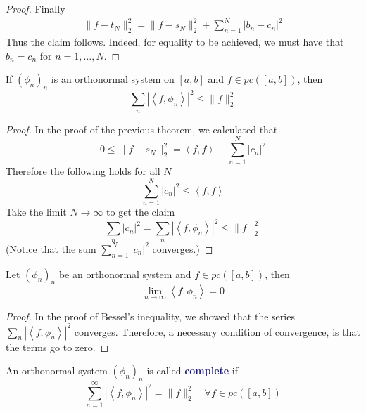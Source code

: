 \documentclass[11pt]{article}
\numberwithin{equation}{section}
\newcommand{\navy}[1]{\textcolor{MidnightBlue}{\bf #1}}
\theoremstyle{definition}
\theoremstyle{definition}
\newcommand\angles[1]{\left\langle #1 \right\rangle}
\newcommand\abs[1]{\left| #1 \right|}
\newcommand\norm[1]{\lVert#1\rVert}
\newcommand{\1}{\mathbbm 1}
\begin{document}
\begin{proof}
Finally
\begin{align*}
	\norm{f-t_N}^2_2 = \norm{f-s_N}^2_2 + \sum_{n=1}^N \abs{b_n - c_n}^2
\end{align*}
Thus the claim follows. Indeed, for equality to be achieved, we must have that $b_n = c_n$ for $n=1,\ldots,N$. 

\end{proof}

\begin{theorem}
	If $(\phi_n)_n$ is an orthonormal system on $[a,b]$ and $f \in pc([a,b])$, then
	\begin{equation}
		\sum_{n} \abs{\angles{f,\phi_n}}^2 \leq \norm{f}^2_2
	\end{equation}
\end{theorem}

\begin{proof}
	In the proof of the previous theorem, we calculated that
	\begin{equation}
		0 \leq \norm{f-s_N}^2_2 = \angles{f,f} - \sum_{n=1}^N \abs{c_n}^2
	\end{equation}
	Therefore the following holds for all $N$
	\begin{equation}
		\sum_{n=1}^N \abs{c_n}^2 \leq \angles{f,f}
	\end{equation}
	Take the limit $N \to \infty$ to get the claim
	\begin{equation}
		\sum_{n} \abs{c_n}^2 = \sum_{n} \abs{\angles{f,\phi_n}}^2 \leq \norm{f}^2_2
	\end{equation}
	(Notice that the sum $\sum_{n=1}^N \abs{c_n}^2$ converges.)
\end{proof}

\begin{corollary}
	Let $(\phi_n)_n$ be an orthonormal system and $f \in pc([a,b])$, then
	\begin{equation}
		\lim_{n\to\infty} \angles{f,\phi_n} = 0
	\end{equation}
\end{corollary}

\begin{proof}
	In the proof of Bessel's inequality, we showed that the series $\sum_{n} \abs{\angles{f,\phi_n}}^2$ converges. Therefore, a necessary condition of convergence, is that the terms go to zero. 
\end{proof}


\begin{definition}
	An orthonormal system $(\phi_n)_n$ is called \navy{complete} if 
	\begin{equation}
		\sum_{n=1}^\infty \abs{\angles{f,\phi_n}}^2 = \norm{f}^2_2 \quad \forall f \in pc([a,b])
	\end{equation}
\end{definition}
\end{document}
